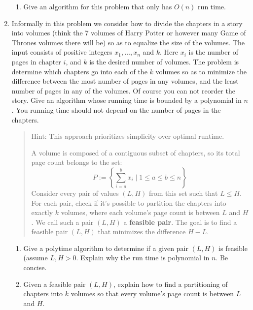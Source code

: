 \documentclass[letterpaper,12pt]{article}
\begin{document}
\begin{enumerate}
\begin{enumerate}
\item
Give an algorithm for this problem that only has $O(n)$ 
run time. 


\end{enumerate}



\item Informally in this problem we consider how to divide the chapters in a story into volumes (think the 7 volumes of Harry Potter
or however many Game of Thrones volumes there will be) so as to equalize the size of the volumes. 
The input consists of positive integers $x_1, \ldots, x_n$ and $k$. Here $x_i$ is the number of pages in chapter $i$, and $k$ is the desired number of volumes. The problem is determine which chapters go
into each of the $k$ volumes so as to minimize the difference between the most number of pages in
any volumes, and the least number of pages in any of the volumes. Of course you can not reorder the story. 
Give an algorithm whose running time is bounded by a  polynomial in $n$. You running time should not
depend on the number of pages in the chapters. 


\smallskip
\begin{quote}
Hint: This approach prioritizes simplicity over optimal runtime.

A volume is composed of a contiguous subset of chapters, so its total page count belongs to the set:
\[
P := \left\{ \sum_{i=a}^{b} x_i \mid 1 \le a \le b \le n \right\}
\]
Consider every pair of values $(L, H)$ from this set such that $L \le H$. For each pair, check if it's possible to partition the chapters into exactly $k$ volumes, where each volume's page count is between $L$ and $H$. We call such a pair $(L, H)$ a \textbf{feasible pair}. The goal is to find a feasible pair $(L, H)$ that minimizes the difference $H-L$. 

\end{quote}

\begin{enumerate}
\item Give a polytime algorithm to determine if a given pair $(L, H)$ is feasible (assume $L, H >0 $. Explain why the run time is polynomial in $n$. Be concise. 


\item Given a feasible pair $(L, H)$, explain how to find a partitioning of chapters into $k$ volumes so that every volume's page count is between $L$ and $H$. 


\end{enumerate}



\end{enumerate}
\end{document}
